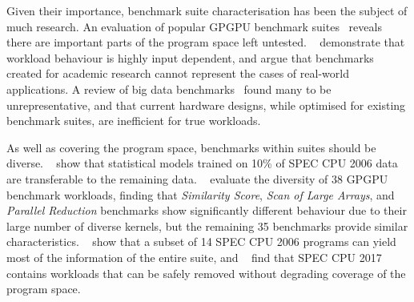 Given their importance, benchmark suite characterisation has been the subject of much research. An evaluation of popular GPGPU benchmark suites~\cite{Ryoo2015} reveals there are important parts of the program space left untested.
\citeauthor{Xiong2013}~\cite{Xiong2013} demonstrate that workload behaviour is highly input dependent, and argue that benchmarks created for academic research cannot represent the cases of real-world applications.
A review of big data benchmarks~\cite{Ferdman2012} found many to be unrepresentative, and that current hardware designs, while optimised for existing benchmark suites, are inefficient for true workloads.

As well as covering the program space, benchmarks within suites should be diverse.
\citeauthor{Ould-Ahmed-Vall2008}~\cite{Ould-Ahmed-Vall2008} show that statistical models trained on 10\% of SPEC CPU 2006 data are transferable to the remaining data.
\citeauthor{Goswami2010}~\cite{Goswami2010} evaluate the diversity of 38 GPGPU benchmark workloads, finding that \emph{Similarity Score}, \emph{Scan of Large Arrays}, and \emph{Parallel Reduction} benchmarks show significantly different behaviour due to their large number of diverse kernels, but the remaining 35 benchmarks provide similar characteristics.
\citeauthor{Phansalkar2007}~\cite{Phansalkar2007} show that a subset of 14 SPEC CPU 2006 programs can yield most of the information of the entire suite, and
\citeauthor{Draft2018}~\cite{Draft2018} find that SPEC CPU 2017 contains workloads that can be safely removed without degrading coverage of the program space.


